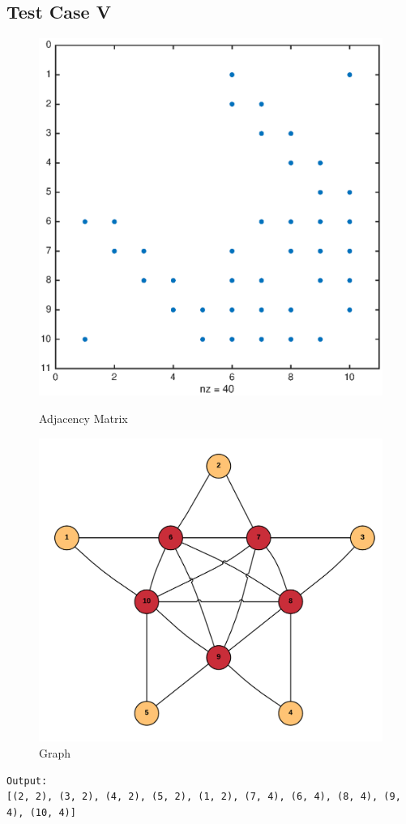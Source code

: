 \subsection{Test Case V}
\begin{figure}[H]
  \includegraphics[width=\linewidth]{spy5.eps}
  \caption{Adjacency Matrix}
\endminipage\hfill
{}
  \includegraphics[width=\linewidth]{graph5}
  \caption{Graph}
\endminipage
\end{figure}

\begin{verbatim}
Output:
[(2, 2), (3, 2), (4, 2), (5, 2), (1, 2), (7, 4), (6, 4), (8, 4), (9, 4), (10, 4)]
\end{verbatim}